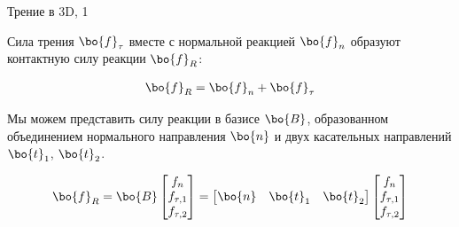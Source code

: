 \documentclass{beamer}
\begin{document}
\begin{frame}{Трение в 3D, 1}
	\begin{flushleft}
		
		Сила трения $\bo{f}_\tau$ вместе с нормальной реакцией $\bo{f}_n$ образуют контактную силу реакции $\bo{f}_R$:
		
		\begin{align}
			\bo{f}_R = \bo{f}_n + \bo{f}_\tau
		\end{align}
		
		Мы можем представить силу реакции в базисе $\bo{B}$, образованном объединением нормального направления $\bo{n}$ и двух касательных направлений $\bo{t}_1$, $\bo{t}_2$.
		
		\begin{align}
			\bo{f}_R
			=
			\bo{B}
			\begin{bmatrix}
				f_n \\ f_{\tau, 1} \\ f_{\tau, 2}
			\end{bmatrix}
			=
			\begin{bmatrix}
				\bo{n} & \bo{t}_1 & \bo{t}_2
			\end{bmatrix}
			\begin{bmatrix}
				f_n \\ f_{\tau, 1} \\ f_{\tau, 2}
			\end{bmatrix}
		\end{align}
		
		
		
	\end{flushleft}
\end{frame}
\end{document}
